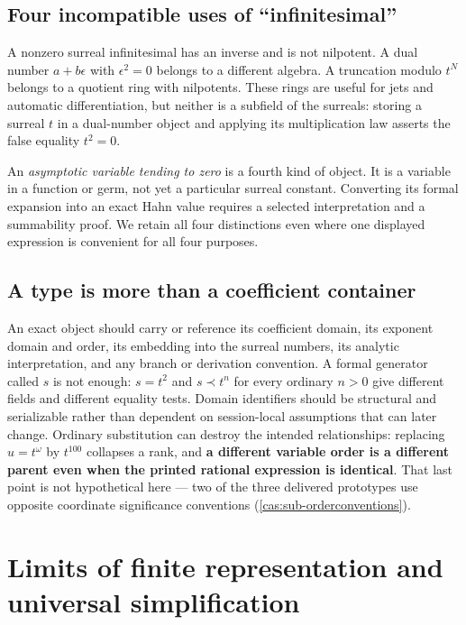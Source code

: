 \documentclass[11pt,letterpaper]{article}
\numberwithin{equation}{section}
\theoremstyle{definition}
\theoremstyle{remark}
\begin{document}
\subsection{Four incompatible uses of ``infinitesimal''}
\label{cas:sub-fourinf}
A nonzero surreal infinitesimal has an inverse and is not nilpotent. A dual
number $a+b\epsilon$ with $\epsilon^2=0$ belongs to a different algebra. A
truncation modulo $t^N$ belongs to a quotient ring with nilpotents. These rings
are useful for jets and automatic differentiation, but neither is a subfield of
the surreals: storing a surreal $t$ in a dual-number object and applying its
multiplication law asserts the false equality $t^2=0$.

An \emph{asymptotic variable tending to zero} is a fourth kind of object. It is
a variable in a function or germ, not yet a particular surreal constant.
Converting its formal expansion into an exact Hahn value requires a selected
interpretation and a summability proof. We retain all four distinctions even
where one displayed expression is convenient for all four purposes.

\subsection{A type is more than a coefficient container}
\label{cas:sub-type}
An exact object should carry or reference its coefficient domain, its exponent
domain and order, its embedding into the surreal numbers, its analytic
interpretation, and any branch or derivation convention. A formal generator
called $s$ is not enough: $s=t^2$ and $s\prec t^n$ for every ordinary $n>0$ give
different fields and different equality tests. Domain identifiers should be
structural and serializable rather than dependent on session-local assumptions
that can later change. Ordinary substitution can destroy the intended
relationships: replacing $u=t^\omega$ by $t^{100}$ collapses a rank, and
\textbf{a different variable order is a different parent even when the printed
rational expression is identical}. That last point is not hypothetical here ---
two of the three delivered prototypes use opposite coordinate significance
conventions (\cref{cas:sub-orderconventions}).

\section{Limits of finite representation and universal simplification}
\label{cas:sec-limits}
\end{document}
